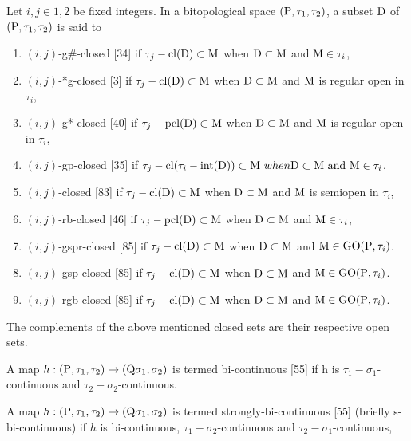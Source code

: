\begin{dfn}\label{dfn1.6.1}
Let $i, j\in {1, 2}$ be fixed integers. In a bitopological space $(\mathrm{P}, \tau_1, \tau_2)$, a subset $\mathrm{D}$ of $(\mathrm{P}, \tau_1, \tau_2)$ is said to
\begin{enumerate}[\rm (i)]
\item $(i, j)$-g\#-closed [34] if $\tau_j- \mathrm{cl}(\mathrm{D})\subset \mathrm{M}$ when $\mathrm{D}\subset\mathrm{M}$ and $\mathrm{M}\in \tau_i$,
\item $(i, j)$-*g-closed [3] if  $\tau_j- \mathrm{cl}(\mathrm{D})\subset\mathrm{M}$ when $\mathrm{D}\subset\mathrm{M}$ and $\mathrm{M}$ is regular open in $\tau_i$,
\item $(i, j)$-g*-closed [40] if $\tau_j-\mbox{pcl}(\mathrm{D}) \subset\mathrm{M}$ when $\mathrm{D}\subset\mathrm{M}$ and $\mathrm{M}$ is regular open in $\tau_i$,
\item $(i, j)$-gp-closed [35] if $\tau_j-\cl(\tau_i-\mbox{int}(\clrD))\subset\TSM\ when \clrD\subset\TSM\ \mbox{and}\ \TSM\in\tau_i$,
\item $(i, j)$-closed [83] if $\tau_j-\mathrm{cl}(\mathrm{D}) \subset  \mathrm{M}$ when $\mathrm{D}\subset\mathrm{M}$ and $\mathrm{M}$ is semiopen in $\tau_i$,
\item $(i, j)$-rb-closed [46] if $\tau_j- \mbox{pcl}(\mathrm{D}) \subset\mathrm{M}$ when $\mathrm{D}\subset\mathrm{M}$ and $\mathrm{M}\in\tau_i$,
\item $(i, j)$-gspr-closed [85] if $\tau_j-\mathrm{cl}(\mathrm{D}) \subset  \mathrm{M}$ when $\mathrm{D} \subset  \mathrm{M}$ and $\mathrm{M}\in\mbox{GO}(\mathrm{P}, \tau_i)$.
\item $(i, j)$-gsp-closed [85] if $\tau_j- \mathrm{cl}(\mathrm{D}) \subset  \mathrm{M}$ when $\mathrm{D} \subset  \mathrm{M}$ and $\mathrm{M}\in \mbox{GO}(\mathrm{P}, \tau_i)$.
\item $(i, j)$-rgb-closed [85] if $\tau_j- \mathrm{cl}(\mathrm{D}) \subset  \mathrm{M}$ when $\mathrm{D} \subset  \mathrm{M}$ and $\mathrm{M}\in \mbox{GO}(\mathrm{P}, \tau_i)$.
\end{enumerate}
\end{dfn}

The complements of the above mentioned closed sets are their respective open sets. 
\begin{dfn}\label{dfn1.6.2}
A map  $h: (\mathrm{P}, \tau_1, \tau_2)\rightarrow(\mathrm{Q} \sigma_1, \sigma_2)$ is termed  bi-continuous [55] if h is $\tau_1-\sigma_1$-continuous and $\tau_2-\sigma_2$-continuous.
\end{dfn}

\begin{dfn}\label{dfn1.6.3}
A map $h: (\mathrm{P}, \tau_1, \tau_2)\rightarrow(\mathrm{Q} \sigma_1, \sigma_2)$ is termed strongly-bi-continuous [55] (briefly s-bi-continuous) if $h$ is bi-continuous, $\tau_1-\sigma_2$-continuous and $\tau_2-\sigma_1$-continuous,
\end{dfn}

